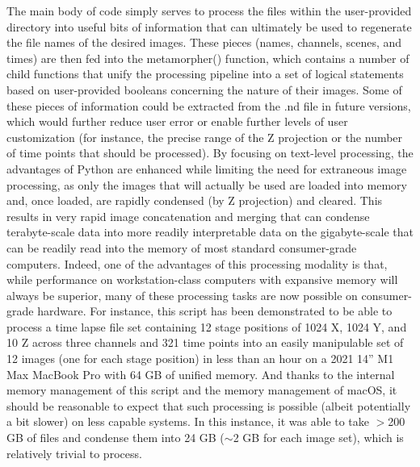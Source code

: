 The main body of code simply serves to process the files within the user-provided directory into useful bits of information that can ultimately be used to regenerate the file names of the desired images. These pieces (names, channels, scenes, and times) are then fed into the metamorpher() function, which contains a number of child functions that unify the processing pipeline into a set of logical statements based on user-provided booleans concerning the nature of their images. Some of these pieces of information could be extracted from the .nd file in future versions, which would further reduce user error or enable further levels of user customization (for instance, the precise range of the Z projection or the number of time points that should be processed). By focusing on text-level processing, the advantages of Python are enhanced while limiting the need for extraneous image processing, as only the images that will actually be used are loaded into memory and, once loaded, are rapidly condensed (by Z projection) and cleared. This results in very rapid image concatenation and merging that can condense terabyte-scale data into more readily interpretable data on the gigabyte-scale that can be readily read into the memory of most standard consumer-grade computers. Indeed, one of the advantages of this processing modality is that, while performance on workstation-class computers with expansive memory will always be superior, many of these processing tasks are now possible on consumer-grade hardware. For instance, this script has been demonstrated to be able to process a time lapse file set containing 12 stage positions of 1024 X, 1024 Y, and 10 Z across three channels and 321 time points into an easily manipulable set of 12 images (one for each stage position) in less than an hour on a 2021 14'' M1 Max MacBook Pro with 64 GB of unified memory. And thanks to the internal memory management of this script and the memory management of macOS, it should be reasonable to expect that such processing is possible (albeit potentially a bit slower) on less capable systems. In this instance, it was able to take $>$200 GB of files and condense them into 24 GB ($\sim$2 GB for each image set), which is relatively trivial to process. 

